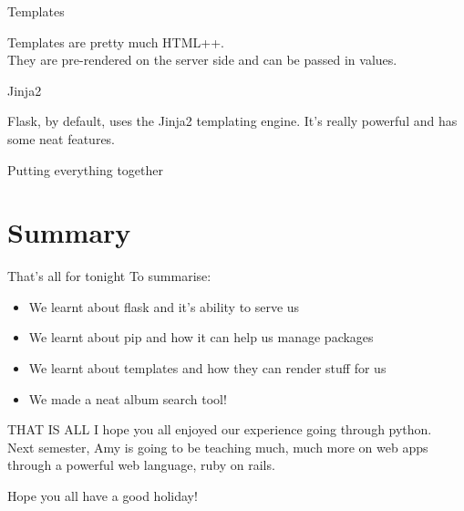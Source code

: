 \documentclass{beamer}
\begin{document}
\begin{frame}{Templates}

Templates are pretty much HTML++.\\ \pause
They are pre-rendered on the server side and can be passed in values.

\end{frame}

\begin{frame}{Jinja2}

Flask, by default, uses the Jinja2 templating engine. It's really powerful and has some neat features.

\end{frame}

\begin{frame}{Putting everything together}

\end{frame}

\section{Summary}

\begin{frame}{That's all for tonight}
  To summarise:
  \pause
  \begin{itemize}
  \item We learnt about flask and it's ability to serve us\pause
  \item We learnt about pip and how it can help us manage packages\pause
  \item We learnt about templates and how they can render stuff for us\pause
  \item We made a neat album search tool!
  \end{itemize}
\end{frame}

\begin{frame}{THAT IS ALL}
I hope you all enjoyed our experience going through python.\\
Next semester, Amy is going to be teaching much, much more on web apps through a powerful web language, ruby on rails.\\
\end{frame}

\begin{frame}{Hope you all have a good holiday!}

\end{frame}
\end{document}

